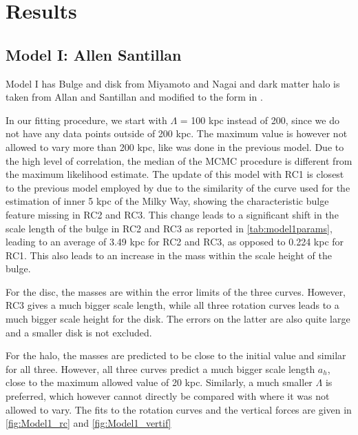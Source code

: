\documentclass[fleqn,usenatbib]{mnras}
\begin{document}
\section{Results}

\subsection{Model I: Allen Santillan}

Model I has Bulge and disk from Miyamoto and Nagai and dark matter halo is taken from Allan and Santillan and modified to the form in \citet{andreassmass}.

 In our fitting procedure, we start with $\Lambda$ = 100 kpc instead of 200, since we do not have any data points outside of 200 kpc. The maximum value is however not allowed to vary more than 200 kpc, like was done in the previous model. Due to the high level of correlation, the median of the MCMC procedure is different from the maximum likelihood estimate. The update of this model with RC1 is closest to the previous model employed by \citet{andreassmass} due to the similarity of the curve used for the estimation of inner 5 kpc of the Milky Way, showing the characteristic bulge feature missing in RC2 and RC3. This change leads to a significant shift in the scale length of the bulge in RC2 and RC3 as reported in \ref{tab:model1params}, leading to an average of 3.49 kpc for RC2 and RC3, as opposed to 0.224 kpc for RC1. This also leads to an increase in the mass within the scale height of the bulge.
 
 For the disc, the masses are within the error limits of the three curves. However, RC3 gives a much bigger scale length, while all three rotation curves leads to a much bigger scale height for the disk. The errors on the latter are also quite large and a smaller disk is not excluded.
 
 For the halo, the masses are predicted to be close to the initial value and similar for all three. However, all three curves predict a much bigger scale length $a_h$, close to the maximum allowed value of 20 kpc. Similarly, a much smaller $\Lambda$ is preferred, which however cannot directly be compared with  where it was not allowed to vary. The fits to the rotation curves and the vertical forces are given in \ref{fig:Model1_rc} and \ref{fig:Model1_vertif}
\end{document}
